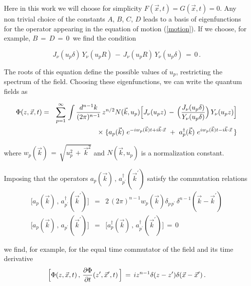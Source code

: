 \documentclass[a4paper,12pt]{article}
\begin{document}
\noindent Here in this work we will choose for simplicity  $F(\vec x, t)= 
G(\vec x, t)=0$. 
Any non trivial choice of the constants $A$, $B$, $C$, $D$
leads to a basis of eigenfunctions for the  
operator appearing in the equation of motion (\ref{motion}).
If we choose, for example, $B\,=\,D\,=\,0\,$ we find the condition

\begin{equation}
\label{Sol2}
 J_{\nu}(u_p \delta) \, Y_{\nu}(u_p R ) \,-
\, J_{\nu}(u_p R ) \, Y_{\nu}(u_p \delta ) \,=\,0\,.
\end{equation}

\noindent The roots of this equation define the possible values of $u_p$,
restricting the spectrum of the field. Choosing these eigenfunctions, we
can write the quantum fields as

\begin{eqnarray}
\label{QF}
\Phi(z,\vec x,t) &=&  
\sum_{p=1}^\infty \,
\int {d^{n-1}k \over (2\pi)^{n-1}}\,
 z^{n/2} N (\vec k , u_p )\Big[ J_\nu (u_p z ) \,- \, 
\Big( { J_\nu (u_p \delta )\over
   Y_{\nu}(u_p \delta )} \Big)\,  Y_{\nu}(u_p z ) \Big]
\nonumber\\
&&\qquad 
\times \; \lbrace { a_p(\vec k )\ } e^{-iw_p(\vec k ) t +i\vec k \cdot 
\vec x}\,
\,+\,\,{ a_p^\dagger(\vec k )\ } e^{iw_p(\vec k ) t 
-i\vec k \cdot \vec x}\, \rbrace
\end{eqnarray}

\noindent where $w_p(\vec k ) \,=\,\sqrt{ u_p^2\,+\,{\vec k}^2}$ and 
$N(\vec k , u_p )$ is a normalization constant.

Imposing that the operators $a_p(\vec k )\,,\,
a^\dagger_{p^\prime}({\vec k}^\prime)$ 
satisfy the commutation relations
\begin{eqnarray}
\Big[ a_p(\vec k )\,,\,a^\dagger_{p^\prime}({\vec k}^\prime  )
\Big]&=& 2\, (2\pi)^{n-1} w_p(\vec k )   
\delta_{p\,  p^\prime}\,\delta^{n-1} (\vec k -
{\vec k}^\prime )  \nonumber\\
\Big[ a_p(\vec k )\,,\,a_{p^\prime}({\vec k}^\prime  )
\Big] &=& \Big[ a^\dagger_p(\vec k )\,,\,
a^\dagger_{p^\prime}({\vec k}^\prime  ) \Big]\,=\,0
\end{eqnarray}


\noindent we find, for example, for the equal time commutator of the field 
and its time derivative
\begin{equation}
\Big[ \Phi (z,\vec x ,t)\,,\,{\partial\Phi\over \partial t}(z^\prime,
\vec x^\prime ,t)\,\Big]\,=\,i z^{n-1} \delta (z - z^\prime) 
\delta (\vec x - {\vec x}^\prime )\,.
\end{equation}
\end{document}
